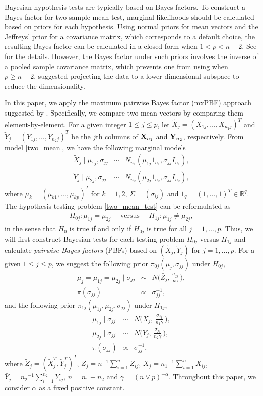 \documentclass[11pt]{article}
\newcommand{\bea}{\begin{eqnarray*}}
\newcommand{\eea}{\end{eqnarray*}}
\newcommand{\bfX}{{\bf X}}
\newcommand{\bfY}{{\bf Y}}
\newcommand{\sg}{\Sigma}
\newcommand{\bbR}{\mathbb{R}}
\begin{document}
Bayesian hypothesis tests are typically based on Bayes factors. To construct a Bayes factor for two-sample mean test, marginal likelihoods should be calculated based on priors for each hypothesis.
Using normal priors for mean vectors and the Jeffreys' prior for a covariance matrix, which corresponds to a default choice, the resulting Bayes factor can be calculated in a closed form when $1<p<n-2$.
See \cite{zoh2018powerful} for the details.
However, the Bayes factor under such priors involves the inverse of a pooled sample covariance matrix, which prevents one from using when $p \ge n-2$.
\cite{zoh2018powerful} suggested projecting the data to a lower-dimensional subspace to reduce the dimensionality.


In this paper, we apply the maximum pairwise Bayes factor (mxPBF) approach suggested by \cite{lee2018maximum}.
Specifically, we compare two mean vectors by comparing them element-by-element. For a given integer $1\le j \le p$, let $\tilde{X}_j = (X_{1j},\ldots, X_{n_1 j})^T$ and $\tilde{Y}_j = (Y_{1j},\ldots, Y_{n_2 j})^T$ be the $j$th columns of $\bfX_{n_1}$ and $\bfY_{n_2}$, respectively.
From model \eqref{two_mean}, we have the following marginal models
\bea
\tilde{X}_j \mid \mu_{1j}, \sigma_{jj} &\sim& N_{n_1}(\mu_{1j}1_{n_1}, \sigma_{jj}I_{n_1} ) , \\
\tilde{Y}_j \mid \mu_{2j}, \sigma_{jj} &\sim& N_{n_2}(\mu_{2j}1_{n_2}, \sigma_{jj}I_{n_2} ) ,
\eea
where $\mu_k= (\mu_{k1},\ldots,\mu_{kp})^T$ for $k=1,2$, $\sg = (\sigma_{ij})$ and $1_q = (1,\ldots, 1)^T \in \bbR^q$.
The hypothesis testing problem \eqref{two_mean_test} can be reformulated as
\bea
H_{0j}: \mu_{1j} = \mu_{2j} \quad\text{ versus }\quad H_{1j}: \mu_{1j} \neq \mu_{2j} ,
\eea
in the sense that $H_0$ is true if and only if $H_{0j}$ is true for all $j=1,\ldots,p$.
Thus, we will first construct Bayesian tests for each testing problem $H_{0j}$ versus $H_{1j}$ and calculate {\it pairwise Bayes factors} (PBFs) based on $(\tilde{X}_j, \tilde{Y}_j)$ for $j=1,\ldots, p$.
For a given $1\le j \le p$, we suggest the following prior $\pi_{0j}(\mu_j , \sigma_{jj})$ under $H_{0j}$,
\bea
\mu_j = \mu_{1j} = \mu_{2j} \mid \sigma_{jj} &\sim& N \Big( \bar{Z}_j, \, \frac{\sigma_{jj}}{n\gamma} \,\Big) , \\
\pi(\sigma_{jj}) &\propto& \sigma_{jj}^{-1} ,
\eea
and the following prior $\pi_{1j}(\mu_{1j}, \mu_{2j} , \sigma_{jj})$ under $H_{1j}$,
\bea
\mu_{1j} \mid \sigma_{jj} &\sim& N \Big( \bar{X}_j, \, \frac{\sigma_{jj}}{n_1\gamma} \,\Big) , \\
\mu_{2j} \mid \sigma_{jj} &\sim& N \Big( \bar{Y}_j, \, \frac{\sigma_{jj}}{n_2\gamma} \,\Big) , \\
\pi(\sigma_{jj}) &\propto& \sigma_{jj}^{-1},
\eea
where $\tilde{Z}_j = (\tilde{X}_j^T, \tilde{Y}_j^T)^T$, $\bar{Z}_j = n^{-1}\sum_{i=1}^n Z_{ij}$, $\bar{X}_j = {n_1}^{-1}\sum_{i=1}^{n_1} X_{ij}$, $\bar{Y}_j = {n_2}^{-1}\sum_{i=1}^{n_2} Y_{ij}$, $n=n_1+n_2$ and $\gamma =  (n\vee p)^{-\alpha}$.
Throughout this paper, we consider $\alpha$ as a fixed positive constant.
\end{document}
